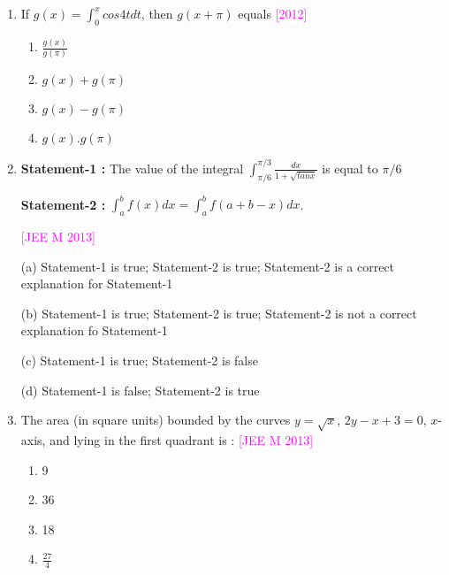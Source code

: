 \documentclass[journal,12pt,twocolumn]{IEEEtran}
\theoremstyle{remark}
\begin{document}
\begin{enumerate}[label=\textcolor{magenta}{\arabic*.}]
		\begin{multicols}{4}
			\begin{enumerate}[label=(\alph*)]
				\item $20\sqrt{2}$
				\item $\frac{10\sqrt{2}}{3}$
				\item $\frac{20\sqrt{2}}{3}$
				\item $10\sqrt{2}$
			\end{enumerate}
		\end{multicols}


	\item If $g(x)=\int_0^xcos4t dt$, then $g(x+\pi)$ equals
		\hfill{\textcolor{magenta}{[2012]}}

		\begin{multicols}{2}
			\begin{enumerate}[label=(\alph*)]
				\item $\frac{g(x)}{g(\pi)}$
				\item $g(x)+g(\pi)$
				\item $g(x)-g(\pi)$
				\item $g(x).g(\pi)$
			\end{enumerate}
		\end{multicols}


	\item \textbf{Statement-1 :} The value of the integral $\int_{\pi/6}^{\pi/3}\frac{dx}{1+\sqrt{tanx}}$ is equal to $\pi/6$

		\textbf{Statement-2 :} $\int_a^bf(x)dx=\int_a^bf(a+b-x)dx$.

		\hfill{\textcolor{magenta}{[JEE M 2013]}}
		
		(a) Statement-1 is true; Statement-2 is true; Statement-2 is a correct explanation for Statement-1

		(b) Statement-1 is true; Statement-2 is true; Statement-2 is not a correct explanation fo Statement-1

		(c) Statement-1 is true; Statement-2 is false

		(d) Statement-1 is false; Statement-2 is true


	\item The area (in square units) bounded by the curves $y=\sqrt{x}$, $2y-x+3=0$, $x$-axis, and lying in the first quadrant is :
		\hfill{\textcolor{magenta}{[JEE M 2013]}}

		\begin{multicols}{4}
			\begin{enumerate}[label=(\alph*)]
				\item 9
				\item 36
				\item 18
				\item $\frac{27}{4}$
			\end{enumerate}
		\end{multicols}



\end{enumerate}
\end{document}
